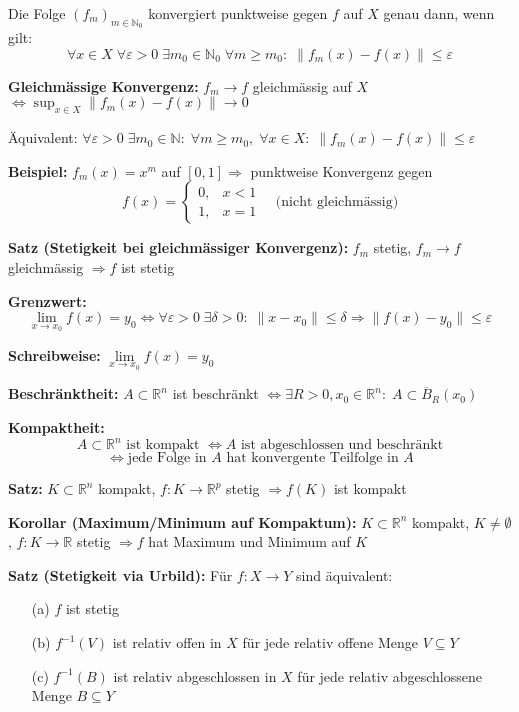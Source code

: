 \begin{itemize}
Die Folge $(f_m)_{m \in \mathbb{N}_0}$ konvergiert punktweise gegen $f$ auf $X$ genau dann, wenn gilt:
\[
\forall x \in X\; \forall \varepsilon > 0\; \exists m_0 \in \mathbb{N}_0\; \forall m \ge m_0:\; \|f_m(x) - f(x)\| \le \varepsilon
\]

\textbf{Gleichmässige Konvergenz:}  
\(f_m \to f\) gleichmässig auf \(X\)  
\(\Leftrightarrow \sup_{x \in X} \|f_m(x) - f(x)\| \to 0\)

Äquivalent:  
\(\forall \varepsilon > 0\; \exists m_0 \in \mathbb{N}:\; \forall m \ge m_0,\; \forall x \in X:\; \|f_m(x) - f(x)\| \le \varepsilon\)

\textbf{Beispiel:} \(f_m(x) = x^m\) auf \([0,1] \Rightarrow\) punktweise Konvergenz gegen  
\[
f(x) = \begin{cases}
0, & x < 1 \\
1, & x = 1
\end{cases}
\quad \text{(nicht gleichmässig)}
\]

\textbf{Satz (Stetigkeit bei gleichmässiger Konvergenz):}  
\(f_m\) stetig,\; \(f_m \to f\) gleichmässig \(\Rightarrow f\) ist stetig


\textbf{Grenzwert:}  
\[
\lim_{x \to x_0} f(x) = y_0 \Leftrightarrow
\forall \varepsilon > 0\; \exists \delta > 0:\;
\|x - x_0\| \leq \delta \Rightarrow \|f(x) - y_0\| \leq \varepsilon
\]

\textbf{Schreibweise:}  
\( \lim\limits_{x \to x_0} f(x) = y_0 \)

\textbf{Beschränktheit:}  
\(A \subset \mathbb{R}^n\) ist beschränkt \(\Leftrightarrow \exists R > 0, x_0 \in \mathbb{R}^n:\; A \subset \overline{B}_R(x_0)\)

\textbf{Kompaktheit:}  
\[
A \subset \mathbb{R}^n \text{ ist kompakt } \Leftrightarrow A \text{ ist abgeschlossen und beschränkt}
\]
\[
\Leftrightarrow \text{jede Folge in } A \text{ hat konvergente Teilfolge in } A
\]

\textbf{Satz:}  
\(K \subset \mathbb{R}^n\) kompakt,\; \(f: K \to \mathbb{R}^p\) stetig  
\(\Rightarrow f(K)\) ist kompakt

\textbf{Korollar (Maximum/Minimum auf Kompaktum):}  
\(K \subset \mathbb{R}^n\) kompakt, \(K \ne \emptyset\), \(f: K \to \mathbb{R}\) stetig  
\(\Rightarrow f\) hat Maximum und Minimum auf \(K\)

\textbf{Satz (Stetigkeit via Urbild):}  
Für \(f: X \to Y\) sind äquivalent:
\begin{itemize}
  \item[(a)] \(f\) ist stetig
  \item[(b)] \(f^{-1}(V)\) ist relativ offen in \(X\) für jede relativ offene Menge \(V \subseteq Y\)
  \item[(c)] \(f^{-1}(B)\) ist relativ abgeschlossen in \(X\) für jede relativ abgeschlossene Menge \(B \subseteq Y\)
\end{itemize}


\end{itemize}
